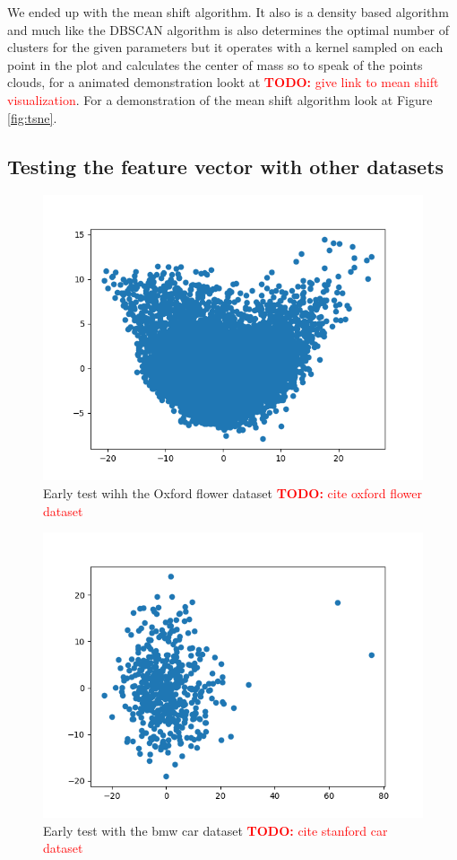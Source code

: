 \documentclass[journal]{vgtc}       %
\newcommand{\todo}[1]{\textcolor{red}{\textbf{TODO:} #1}}
\begin{document}
We ended up with the mean shift algorithm. It also is a density based algorithm and much like the DBSCAN algorithm is also determines the optimal number of clusters for the given parameters but it operates with a kernel sampled on each point in the plot and calculates the center of mass so to speak of the points clouds, for a animated demonstration lookt at \todo{give link to mean shift visualization}. For a demonstration of the mean shift algorithm look at Figure \ref{fig:tsne}. 




\subsection{Testing the feature vector with other datasets}
\begin{figure}[tb]
	\begin{center}
		\includegraphics[width=.75\linewidth]{Figure1.png}
	\end{center}
	\caption{\label{fig:lorem} Early test wihh the Oxford flower dataset \todo{cite oxford flower dataset}}
\end{figure} 
\begin{figure}[tb]
	\begin{center}
		\includegraphics[width=.75\linewidth]{Figure2.png}
	\end{center}
	\caption{\label{fig:bmw} Early test with the bmw car dataset \todo{cite stanford car dataset}\cite{stanfordcar}}
\end{figure}
\end{document}
